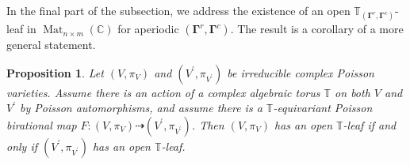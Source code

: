 \documentclass[11pt]{article}
\newcommand{\bg}{\mathbf{\Gamma}}
\DeclareMathOperator{\Mat}{Mat}
\newtheorem{proposition}[theorem]{Proposition}%
\theoremstyle{definition}\newtheorem{definition}[theorem]{Definition}
\theoremstyle{definition}\newtheorem{remark}[theorem]{Remark}
\theoremstyle{remark}
\numberwithin{equation}{section}
\begin{document}
In the final part of the subsection, we address the existence of an open $\mathbb{T}_{(\bg^r,\bg^c)}$-leaf in $\Mat_{n\times m}(\mathbb{C})$ for aperiodic $(\bg^r,\bg^c)$. The result is a corollary of a more general statement.

\begin{proposition}\label{p:open_t_leaf}
    Let $(V,\pi_V)$ and $(V^\prime,\pi_{V^\prime})$ be irreducible complex Poisson varieties. Assume there is an action of a complex algebraic torus $\mathbb{T}$ on both $V$ and $V^\prime$ by Poisson automorphisms, and assume there is a $\mathbb{T}$-equivariant Poisson birational map $F : (V,\pi_V) \dashrightarrow (V^\prime,\pi_{V^\prime})$. Then $(V,\pi_V)$ has an open $\mathbb{T}$-leaf if and only if $(V^\prime,\pi_{V^\prime})$ has an open $\mathbb{T}$-leaf.
\end{proposition}
\end{document}
